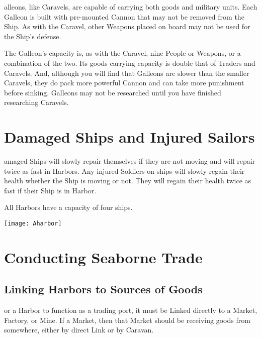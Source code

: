 alleons, like Caravels, are capable of carrying both goods and military units. Each Galleon is built with pre-mounted Cannon that may not be removed from the Ship. As with the Caravel, other Weapons placed on board may not be used for the Ship’s defense.

The Galleon’s capacity is, as with the Caravel, nine People or Weapons, or a combination of the two. Its goods carrying capacity is double that of Traders and Caravels. And, although you will find that Galleons are slower than the smaller Caravels, they do pack more powerful Cannon and can take more punishment before sinking. Galleons may not be researched until you have finished researching Caravels.

\section{{Damaged Ships and Injured Sailors}}


amaged Ships will slowly repair themselves if they are not moving and will repair twice as fast in Harbors. Any injured Soldiers on ships will slowly regain their health whether the Ship is moving or not. They will regain their health twice as fast if their Ship is in Harbor.

All Harbors have a capacity of four ships.

\begin{center}
    \texttt{[image: Aharbor]} %
\end{center}

\section{{Conducting Seaborne Trade}}



\subsection{{Linking Harbors to Sources of Goods}}


or a Harbor to function as a trading port, it must be Linked directly to a Market, Factory, or Mine. If a Market, then that Market should be receiving goods from somewhere, either by direct Link or by Caravan.

